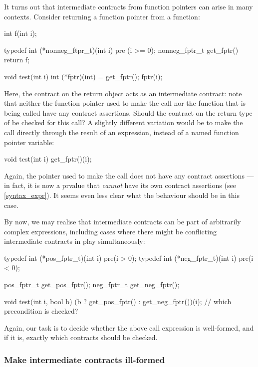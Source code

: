 It turns out that intermediate contracts from function pointers can arise in many contexts. Consider returning a function pointer from a function:
\begin{codeblock}
int f(int i);

typedef int (*nonneg_ftpr_t)(int i) pre (i >= 0);
nonneg_fptr_t get_fptr() { return f; }

void test(int i) {
  int (*fptr)(int) = get_fptr();
  fptr(i);
}
\end{codeblock}
Here, the contract on the return object acts as an intermediate contract: note that neither the function pointer  used to make the call nor the function  that is being called have any contract assertions. Should the contract on the return type of  be checked for this call? A slightly different variation would be to make the call directly through the result of an expression, instead of a named function pointer variable:
\begin{codeblock}
void test(int i) {
  get_fptr()(i);
}
\end{codeblock}
Again, the pointer used to make the call does not have any contract assertions --- in fact, it is now a prvalue that \emph{cannot} have its own contract assertions (see \ref{syntax_expr}). It  seems even less clear what the behaviour should be in this case.

By now, we may realise that intermediate contracts can be part of arbitrarily complex expressions, including cases where there might be conflicting intermediate contracts in play simultaneously:
\begin{codeblock}
typedef int (*pos_fptr_t)(int i) pre(i > 0);
typedef int (*neg_fptr_t)(int i) pre(i < 0);

pos_fptr_t get_pos_fptr();
neg_fptr_t get_neg_fptr();

void test(int i, bool b) {
  (b ? get_pos_fptr() : get_neg_fptr())(i);  // which precondition is checked?
}
\end{codeblock}
Again, our task is to decide whether the above call expression is well-formed, and if it is, exactly which contracts should be checked.


\subsubsection{Make intermediate contracts ill-formed}

